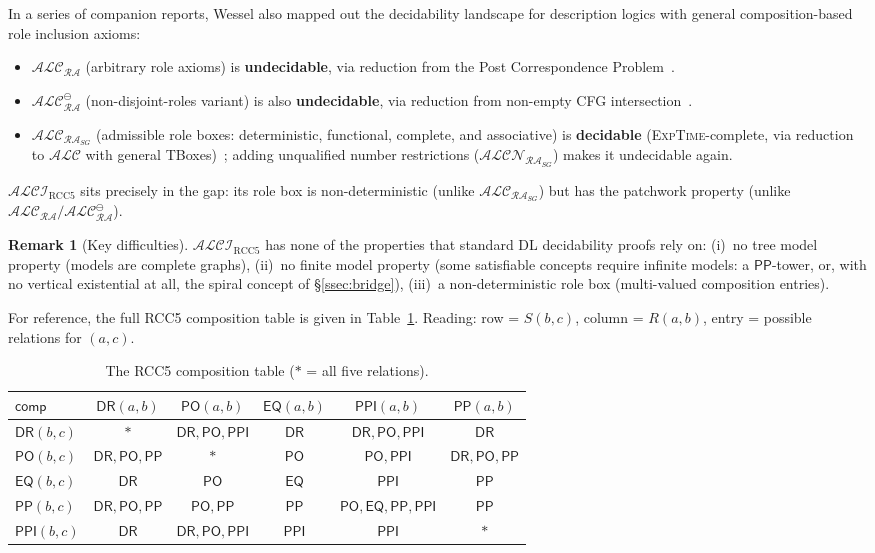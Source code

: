\documentclass[11pt]{article}
\newcommand{\ALCIRCC}[1]{\mathcal{ALCI}_{\mathrm{RCC#1}}}
\newcommand{\DR}{\mathsf{DR}}
\newcommand{\PO}{\mathsf{PO}}
\newcommand{\PP}{\mathsf{PP}}
\newcommand{\PPI}{\mathsf{PPI}}
\newcommand{\EQ}{\mathsf{EQ}}
\newcommand{\EXPTIME}{\textsc{ExpTime}}
\newcommand{\ALC}{\ensuremath{\mathcal{ALC}}}
\newcommand{\comp}{\ensuremath{\mathsf{comp}}}
\theoremstyle{plain}
\theoremstyle{definition}
\newtheorem{remark}[theorem]{Remark}
\begin{document}
In a series of companion reports, Wessel also mapped out the
decidability landscape for description logics with general
composition-based role inclusion axioms:
\begin{itemize}
  \item $\ALC_{\mathcal{RA}}$ (arbitrary role axioms) is
    \textbf{undecidable}, via reduction from the Post
    Correspondence Problem~\cite{Wessel2001RA}.
  \item $\ALC_{\mathcal{RA}}^\ominus$ (non-disjoint-roles
    variant) is also \textbf{undecidable}, via reduction from
    non-empty CFG intersection~\cite{Wessel2000RA}.
  \item $\ALC_{\mathcal{RA}_{SG}}$ (admissible role boxes:
    deterministic, functional, complete, and associative) is
    \textbf{decidable} (\EXPTIME-complete, via reduction to
    $\ALC$ with general TBoxes)~\cite{Wessel2000SG}; adding
    unqualified number restrictions ($\mathcal{ALCN}_{\mathcal{RA}_{SG}}$)
    makes it undecidable again.
\end{itemize}
$\ALCIRCC{5}$ sits precisely in the gap: its role box is
non-deterministic (unlike $\ALC_{\mathcal{RA}_{SG}}$) but
has the patchwork property (unlike
$\ALC_{\mathcal{RA}}/\ALC_{\mathcal{RA}}^\ominus$).

\begin{remark}[Key difficulties]
$\ALCIRCC{5}$ has none of the properties that standard DL
decidability proofs rely on:
(i)~no tree model property (models are complete graphs),
(ii)~no finite model property (some satisfiable concepts require infinite
models: a $\PP$-tower, or, with no vertical existential at all, the spiral
concept of \S\ref{ssec:bridge}),
(iii)~a non-deterministic role box (multi-valued composition entries).
\end{remark}

For reference, the full RCC5 composition table is given in
Table~\ref{tab:comp}.  Reading: row = $S(b,c)$, column = $R(a,b)$,
entry = possible relations for $(a,c)$.

\begin{table}[t]
\centering
\renewcommand{\arraystretch}{1.15}
\begin{tabular}{l|ccccc}
\toprule
$\comp$ & $\DR(a,b)$ & $\PO(a,b)$ & $\EQ(a,b)$ & $\PPI(a,b)$ & $\PP(a,b)$ \\
\midrule
$\DR(b,c)$ & $*$ & $\DR,\PO,\PPI$ & $\DR$ & $\DR,\PO,\PPI$ & $\DR$ \\
$\PO(b,c)$ & $\DR,\PO,\PP$ & $*$ & $\PO$ & $\PO,\PPI$ & $\DR,\PO,\PP$ \\
$\EQ(b,c)$ & $\DR$ & $\PO$ & $\EQ$ & $\PPI$ & $\PP$ \\
$\PP(b,c)$ & $\DR,\PO,\PP$ & $\PO,\PP$ & $\PP$ & $\PO,\EQ,\PP,\PPI$ & $\PP$ \\
$\PPI(b,c)$ & $\DR$ & $\DR,\PO,\PPI$ & $\PPI$ & $\PPI$ & $*$ \\
\bottomrule
\end{tabular}
\caption{The RCC5 composition table ($*$ = all five relations).}
\label{tab:comp}
\end{table}
\end{document}
